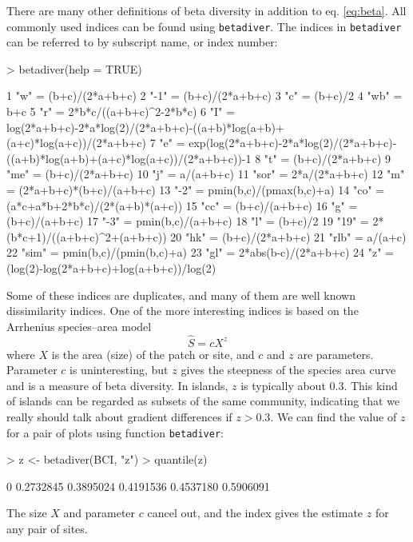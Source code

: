 \documentclass[a4paper,10pt]{amsart}
\begin{document}
There are many other definitions of beta diversity in addition to
eq. \ref{eq:beta}.  All commonly used indices can be found using
\texttt{betadiver}. The indices in \texttt{betadiver} can be referred
to by subscript name, or index number:
\begin{Schunk}
\begin{Sinput}
> betadiver(help = TRUE)
\end{Sinput}
\begin{Soutput}
1 "w" = (b+c)/(2*a+b+c)
2 "-1" = (b+c)/(2*a+b+c)
3 "c" = (b+c)/2
4 "wb" = b+c
5 "r" = 2*b*c/((a+b+c)^2-2*b*c)
6 "I" = log(2*a+b+c)-2*a*log(2)/(2*a+b+c)-((a+b)*log(a+b)+(a+c)*log(a+c))/(2*a+b+c)
7 "e" = exp(log(2*a+b+c)-2*a*log(2)/(2*a+b+c)-((a+b)*log(a+b)+(a+c)*log(a+c))/(2*a+b+c))-1
8 "t" = (b+c)/(2*a+b+c)
9 "me" = (b+c)/(2*a+b+c)
10 "j" = a/(a+b+c)
11 "sor" = 2*a/(2*a+b+c)
12 "m" = (2*a+b+c)*(b+c)/(a+b+c)
13 "-2" = pmin(b,c)/(pmax(b,c)+a)
14 "co" = (a*c+a*b+2*b*c)/(2*(a+b)*(a+c))
15 "cc" = (b+c)/(a+b+c)
16 "g" = (b+c)/(a+b+c)
17 "-3" = pmin(b,c)/(a+b+c)
18 "l" = (b+c)/2
19 "19" = 2*(b*c+1)/((a+b+c)^2+(a+b+c))
20 "hk" = (b+c)/(2*a+b+c)
21 "rlb" = a/(a+c)
22 "sim" = pmin(b,c)/(pmin(b,c)+a)
23 "gl" = 2*abs(b-c)/(2*a+b+c)
24 "z" = (log(2)-log(2*a+b+c)+log(a+b+c))/log(2)
\end{Soutput}
\end{Schunk}
Some of these indices are duplicates, and many of them are well known
dissimilarity indices.
One of the more interesting indices is based
on the Arrhenius species--area model
\begin{equation}
  \label{eq:arrhenius}
  \hat S = c X^z
\end{equation}
where $X$ is the area (size) of the patch or site, and $c$ and $z$ are
parameters. Parameter $c$ is uninteresting, but $z$ gives the
steepness of the species area curve and is a measure of beta
diversity. In islands,  $z$ is typically about $0.3$. This kind of
islands can be regarded as subsets of the same community, indicating
that we really should talk about gradient differences if $z > 0.3$. We
can find the value of $z$ for a pair of plots using function
\texttt{betadiver}:
\begin{Schunk}
\begin{Sinput}
> z <- betadiver(BCI, "z")
> quantile(z)
\end{Sinput}
\begin{Soutput}
       0%       25%       50%       75%      100% 
0.2732845 0.3895024 0.4191536 0.4537180 0.5906091 
\end{Soutput}
\end{Schunk}
The size $X$ and parameter $c$ cancel out, and the index gives the
estimate $z$ for any pair of sites.
\end{document}
